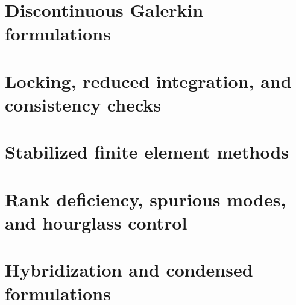 \section{Discontinuous Galerkin formulations}
\label{sec:advanced_methods:dg}


\section{Locking, reduced integration, and consistency checks}
\label{sec:advanced_methods:locking}


\section{Stabilized finite element methods}
\label{sec:advanced_methods:stabilization}


\section{Rank deficiency, spurious modes, and hourglass control}
\label{sec:advanced_methods:spurious_modes}


\section{Hybridization and condensed formulations}
\label{sec:advanced_methods:hybridization}

